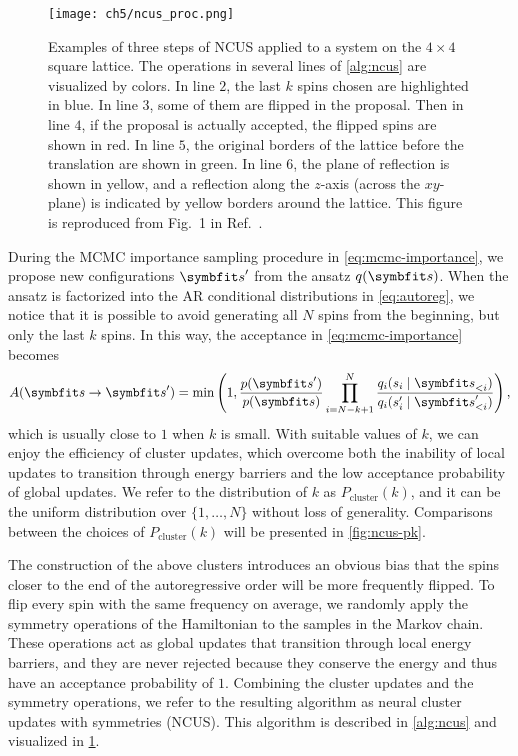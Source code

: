 \begin{figure}[htb]
\centering
\texttt{[image: ch5/ncus\_proc.png]}
\caption[Procedure of neural cluster updates with symmetries (NCUS)]{
Examples of three steps of NCUS applied to a system on the $4 \times 4$ square lattice. The operations in several lines of \cref{alg:ncus} are visualized by colors.
In line $2$, the last $k$ spins chosen are highlighted in {\color[HTML]{1f77b4} blue}.
In line $3$, some of them are flipped in the proposal.
Then in line $4$, if the proposal is actually accepted, the flipped spins are shown in {\color[HTML]{d62728} red}.
In line $5$, the original borders of the lattice before the translation are shown in {\color[HTML]{2ca02c} green}.
In line $6$, the plane of reflection is shown in {\color[HTML]{bcbd22} yellow}, and a reflection along the $z$-axis (across the $x y$-plane) is indicated by yellow borders around the lattice.
This figure is reproduced from Fig.~1 in Ref.~\cite{wu2021unbiased}.
}
\label{fig:ncus-proc}
\end{figure}

During the MCMC importance sampling procedure in \cref{eq:mcmc-importance}, we propose new configurations $\vs'$ from the ansatz $q(\vs)$. When the ansatz is factorized into the AR conditional distributions in \cref{eq:autoreg}, we notice that it is possible to avoid generating all $N$ spins from the beginning, but only the last $k$ spins. In this way, the acceptance in \cref{eq:mcmc-importance} becomes
\begin{equation}
A(\vs \to \vs') = \min\left( 1, \frac{p(\vs')}{p(\vs)} \prod_{i = N - k + 1}^N \frac{q_i(s_i \mid \vs_{< i})}{q_i(s'_i \mid \vs'_{< i})} \right),
\label{eq:ncus-a}
\end{equation}
which is usually close to $1$ when $k$ is small. With suitable values of $k$, we can enjoy the efficiency of cluster updates, which overcome both the inability of local updates to transition through energy barriers and the low acceptance probability of global updates. We refer to the distribution of $k$ as $P_\text{cluster}(k)$, and it can be the uniform distribution over $\{1, \ldots, N\}$ without loss of generality. Comparisons between the choices of $P_\text{cluster}(k)$ will be presented in \cref{fig:ncus-pk}.

The construction of the above clusters introduces an obvious bias that the spins closer to the end of the autoregressive order will be more frequently flipped. To flip every spin with the same frequency on average, we randomly apply the symmetry operations of the Hamiltonian to the samples in the Markov chain. These operations act as global updates that transition through local energy barriers, and they are never rejected because they conserve the energy and thus have an acceptance probability of $1$. Combining the cluster updates and the symmetry operations, we refer to the resulting algorithm as neural cluster updates with symmetries (NCUS). This algorithm is described in \cref{alg:ncus} and visualized in \cref{fig:ncus-proc}.

